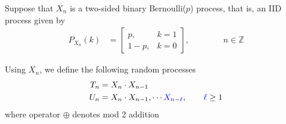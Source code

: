 \ifspanish

\else

Suppose that $X_n$ is a two-sided binary Bernoulli($p$) process, that is, an IID process given by
\begin{align*}
P_{X_n}(k) 
	&= \left[\begin{array}{ll}
             p,   &  k=1   \\
             1-p, &  k=0
          \end{array} \right]   %
,   \qquad\qquad n\in \mathbb{Z}
\end{align*}

Using $X_n$, we define the following random processes
\begin{align*}
T_n &= X_n \cdot X_{n-1}      \\
U_n &= X_n \cdot X_{n-1}, \cdots \textcolor{blue}{X_{n-\ell}},    \qquad \textcolor{blue}{\ell} \ge 1
\end{align*}
where operator $\oplus$ denotes mod 2 addition


